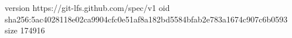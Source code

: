 version https://git-lfs.github.com/spec/v1
oid sha256:5ac4028118e02ca9904cfc0e51af8a182bd5584bfab2e783a1674c907c6b0593
size 174916
